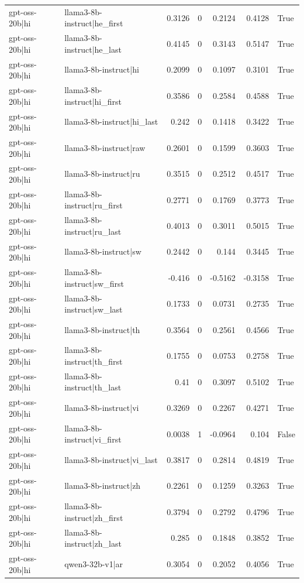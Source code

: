 \begin{table}
\begin{tabular}{l l r r r r l}
gpt-oss-20b|hi & llama3-8b-instruct|he_first & 0.3126 & 0 & 0.2124 & 0.4128 & True \\
gpt-oss-20b|hi & llama3-8b-instruct|he_last & 0.4145 & 0 & 0.3143 & 0.5147 & True \\
gpt-oss-20b|hi & llama3-8b-instruct|hi & 0.2099 & 0 & 0.1097 & 0.3101 & True \\
gpt-oss-20b|hi & llama3-8b-instruct|hi_first & 0.3586 & 0 & 0.2584 & 0.4588 & True \\
gpt-oss-20b|hi & llama3-8b-instruct|hi_last & 0.242 & 0 & 0.1418 & 0.3422 & True \\
gpt-oss-20b|hi & llama3-8b-instruct|raw & 0.2601 & 0 & 0.1599 & 0.3603 & True \\
gpt-oss-20b|hi & llama3-8b-instruct|ru & 0.3515 & 0 & 0.2512 & 0.4517 & True \\
gpt-oss-20b|hi & llama3-8b-instruct|ru_first & 0.2771 & 0 & 0.1769 & 0.3773 & True \\
gpt-oss-20b|hi & llama3-8b-instruct|ru_last & 0.4013 & 0 & 0.3011 & 0.5015 & True \\
gpt-oss-20b|hi & llama3-8b-instruct|sw & 0.2442 & 0 & 0.144 & 0.3445 & True \\
gpt-oss-20b|hi & llama3-8b-instruct|sw_first & -0.416 & 0 & -0.5162 & -0.3158 & True \\
gpt-oss-20b|hi & llama3-8b-instruct|sw_last & 0.1733 & 0 & 0.0731 & 0.2735 & True \\
gpt-oss-20b|hi & llama3-8b-instruct|th & 0.3564 & 0 & 0.2561 & 0.4566 & True \\
gpt-oss-20b|hi & llama3-8b-instruct|th_first & 0.1755 & 0 & 0.0753 & 0.2758 & True \\
gpt-oss-20b|hi & llama3-8b-instruct|th_last & 0.41 & 0 & 0.3097 & 0.5102 & True \\
gpt-oss-20b|hi & llama3-8b-instruct|vi & 0.3269 & 0 & 0.2267 & 0.4271 & True \\
gpt-oss-20b|hi & llama3-8b-instruct|vi_first & 0.0038 & 1 & -0.0964 & 0.104 & False \\
gpt-oss-20b|hi & llama3-8b-instruct|vi_last & 0.3817 & 0 & 0.2814 & 0.4819 & True \\
gpt-oss-20b|hi & llama3-8b-instruct|zh & 0.2261 & 0 & 0.1259 & 0.3263 & True \\
gpt-oss-20b|hi & llama3-8b-instruct|zh_first & 0.3794 & 0 & 0.2792 & 0.4796 & True \\
gpt-oss-20b|hi & llama3-8b-instruct|zh_last & 0.285 & 0 & 0.1848 & 0.3852 & True \\
gpt-oss-20b|hi & qwen3-32b-v1|ar & 0.3054 & 0 & 0.2052 & 0.4056 & True \\

\end{tabular}
\end{table}
